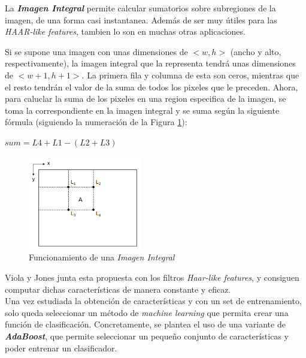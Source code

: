 La \textbf{\textit{Imagen Integral}} permite calcular sumatorios sobre subregiones de la imagen, de una forma casi instantanea. Además de ser muy útiles para las \textit{HAAR-like features}, tambien lo son en muchas otras aplicaciones.

Si se supone una imagen con unas dimensiones de $<w,h>$ (ancho y alto, respectivamente), la imagen integral que la representa tendrá unas dimensiones de $<w+1,h+1>$. La primera fila y columna de esta son ceros, mientras que el resto tendrán el valor de la suma de todos los pixeles que le preceden. \cite{integral-web} Ahora, para caluclar la suma de los pixeles en una region especifica de la imagen, se toma la correspondiente en la imagen integral y se suma según la siguiente fórmula (siguiendo la numeración de la Figura \ref{fig:integral}):
\begin{center}
	$sum = L4 + L1 - (L2 + L3)$ 
\end{center}
\begin{figure}[htp]
	\centering
	\includegraphics[width=5cm]{imagenes/integral.png}
	\caption{Funcionamiento de una \textit{Imagen Integral}}
	\label{fig:integral}
\end{figure}

Viola y Jones junta esta propuesta con los filtros \textit{Haar-like features}, y consiguen computar dichas características de manera constante y eficaz. \cite{integral}\\


%
\newpage
Una vez estudiada la obtención de características y con un set de entrenamiento, solo queda seleccionar un método de \textit{machine learning} que permita crear una función de clasificación. Concretamente, se plantea el uso de una variante de \textbf{\textit{AdaBoost}}, que permite seleccionar un pequeño conjunto de características y poder entrenar un clasificador. 

